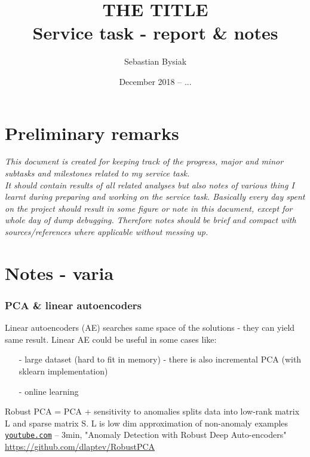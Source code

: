 \documentclass{article}
\title{ THE TITLE \\
Service task - report \& notes}
\author{Sebastian Bysiak}
\date{December 2018 -- ...}
\begin{document}
\maketitle


\section{Preliminary remarks}

\textit{
This document is created for keeping track of the progress, major and minor subtasks and milestones related to my service task.\\
It should contain results of all related analyses but also notes of various thing I learnt during preparing and working on the service task.
Basically every day spent on the project should result in some figure or note in this document, except for whole day of dump debugging. 
Therefore notes should be brief and compact with sources/references where applicable without messing up.
}


\section{Notes - varia}

\subsubsection{PCA \& linear autoencoders}
Linear autoencoders (AE) searches same space of the solutions - they can yield same result.
Linear AE could be useful in some cases like: 
\begin{itemize}[topsep=0pt, itemsep=-2pt]
	\item[-] large dataset (hard to fit in memory) - there is also incremental PCA (with sklearn implementation)
	\item[-] online learning 
\end{itemize}

Robust PCA = PCA + sensitivity to anomalies
splits data into low-rank matrix L and sparse matrix S.
L is low dim approximation of non-anomaly examples \vspace{0pt} \\
\href{https://www.youtube.com/watch?v=eFQVvFMHlC8}{\texttt{youtube.com}} -- 3min, "Anomaly Detection with Robust Deep Auto-encoders"\\
\url{https://github.com/dlaptev/RobustPCA} 
\end{document}
